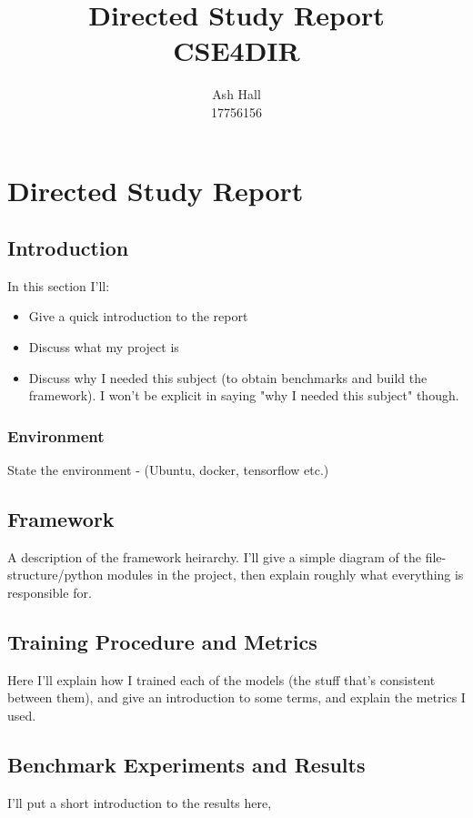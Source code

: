 \documentclass{report}
\title{Directed Study Report\\CSE4DIR}
\author{Ash Hall\\17756156}
\begin{document}
	\maketitle
	\thispagestyle{empty}
	\newpage
	\thispagestyle{empty}
	\tableofcontents
	\newpage
	\thispagestyle{empty}
	\newpage
	
	\setcounter{chapter}{1}	
	\chapter*{Directed Study Report}

	\section{Introduction}
	In this section I'll:
	\begin{itemize}
		\item Give a quick introduction to the report
		\item Discuss what my project is
		\item Discuss why I needed this subject (to obtain benchmarks and build the framework). I won't be explicit in saying "why I needed this subject" though.
	\end{itemize}
	
	\subsection{Environment}
	State the environment - (Ubuntu, docker, tensorflow etc.)
	
	\section{Framework}
	A description of the framework heirarchy. I'll give a simple diagram of the file-structure/python modules in the project, then explain roughly what everything is responsible for.
	
	\section{Training Procedure and Metrics}
	Here I'll explain how I trained each of the models (the stuff that's consistent between them), and give an introduction to some terms, and explain the metrics I used.
	
	\section{Benchmark Experiments and Results}
	I'll put a short introduction to the results here,
	
\end{document}
